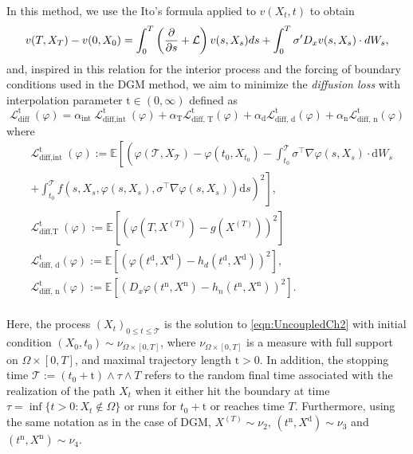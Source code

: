 In this method, we use the Ito's formula applied to $v(X_t,t)$ to obtain
\begin{equation}
	\label{eqn:itoV}
	v(T,X_T)-v(0,X_0)=\int_{0}^{T}\left(\frac{\partial }{\partial s}+\mathcal{L}\right)v(s,X_s)ds+\int_{0}^{T}\sigma'D_x v(s,X_s)\cdot dW_s,
\end{equation}
and, inspired in this relation for the interior process and the forcing of boundary conditions used in the DGM method, we aim to minimize the \textit{diffusion loss} with interpolation parameter $\mathrm{t}\in(0,\infty)$ defined as
\begin{equation}
	\mathcal{L}_{\text {diff }}^{\mathrm{t}}(\varphi)=\alpha_{\text {int }} \mathcal{L}_{\text {diff,int }}^{\mathrm{t}}(\varphi)+\alpha_{\mathrm{T}} \mathcal{L}_{\text {diff, } \mathrm{T}}^{\mathrm{t}}(\varphi)+\alpha_{\mathrm{d}} \mathcal{L}_{\text {diff, } \mathrm{d}}^{\mathrm{t}}(\varphi)+\alpha_{\mathrm{n}} \mathcal{L}_{\text {diff, } \mathrm{n}}^{\mathrm{t}}(\varphi)
\end{equation}
where
\begin{equation}
	\begin{aligned}
		& \mathcal{L}_{\text {diff,int }}^{\mathrm{t}}(\varphi):=\mathbb{E}\left[\left(\varphi\left(\mathcal{T},X_{\mathcal{T}} \right)-\varphi\left(t_0,X_{t_0}\right)-\int_{t_0}^{\mathcal{T}} \sigma^{\top} \nabla \varphi\left(s,X_s\right) \cdot \mathrm{d} W_s\right.\right. \\
		& \left.\left.+\int_{t_0}^{\mathcal{T}} f\left(s,X_s, \varphi\left(s,X_s\right), \sigma^{\top} \nabla \varphi\left(s,X_s\right)\right) \mathrm{d} s\right)^2\right] \text {, } \\
		& \mathcal{L}_{\text {diff,T }}^{\mathrm{t}}(\varphi):=\mathbb{E}\left[\left(\varphi\left(T,X^{(T)}\right)-g\left(X^{(T)}\right)\right)^2\right] \\
		& \mathcal{L}_{\text {diff, } \mathrm{d}}^{\mathrm{t}}(\varphi):=\mathbb{E}\left[\left(\varphi\left(t^{\mathrm{d}},X^{\mathrm{d}}\right)-h_d\left(t^{\mathrm{d}},X^{\mathrm{d}}\right)\right)^2\right], \\
		&
		\mathcal{L}_{\text {diff, } \mathrm{n}}^{\mathrm{t}}(\varphi):=\mathbb{E}\left[\left(D_x\varphi\left(t^{\mathrm{n}},X^{\mathrm{n}} \right)-h_n\left(t^{\mathrm{n}},X^{\mathrm{n}}\right)\right)^2\right]. \\
	\end{aligned}
\end{equation}

Here, the process $(X_t)_{0\leq t\leq \mathcal{T}}$ is the solution to \eqref{eqn:UncoupledCh2} with initial condition $(X_0,t_0)\sim \nu_{\Omega\times [0,T]}$, where $\nu_{\Omega\times [0,T]}$ is a measure with full support on $\Omega\times[0,T]$,  and maximal trajectory length $\mathrm{t}>0$. In addition, the stopping time $\mathcal{T}:=(t_0+\mathrm{t})\wedge \tau \wedge T$ refers to the random final time associated with the realization of the path $X_t$ when it either hit the boundary at time $\tau=\inf\{t>0: X_t\notin\Omega\}$ or runs for $t_0+\mathrm{t}$ or reaches time $T$. Furthermore, using the same notation as in the case of DGM, $X^{(T)} \sim \nu_{2}$, $(t^{\mathrm{n}},X^{\mathrm{d}})\sim \nu_{3}$ and $(t^\mathrm{n},X^{\mathrm{n}})\sim \nu_{4}$.

